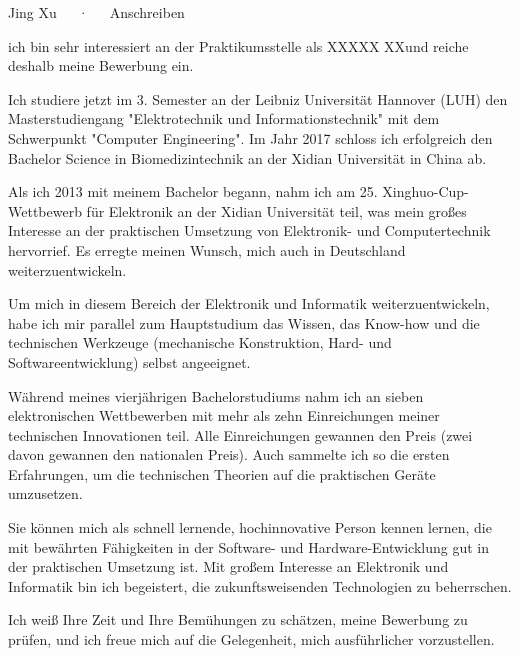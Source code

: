 \documentclass[11pt, a4paper]{awesome-cv}
\providecommand{\applicatename}{XXXXX  XX}
\begin{document}
\makecvheader[R]

\makecvfooter
  {}
  {Jing Xu~~~·~~~Anschreiben}
  {}

\makelettertitle

\begin{cvletter}


ich bin sehr interessiert an der Praktikumsstelle als \applicatename \space und reiche deshalb meine Bewerbung ein.

Ich studiere jetzt im 3. Semester an der Leibniz Universität Hannover (LUH) den Masterstudiengang "Elektrotechnik und Informationstechnik" mit dem Schwerpunkt "Computer Engineering". Im Jahr 2017 schloss ich erfolgreich den Bachelor Science in Biomedizintechnik an der Xidian Universität in China ab.

Als ich 2013 mit meinem Bachelor begann, nahm ich am 25. Xinghuo-Cup-Wettbewerb für Elektronik an der Xidian Universität teil, was mein großes Interesse an der praktischen Umsetzung von Elektronik- und Computertechnik hervorrief. Es erregte meinen Wunsch, mich auch in Deutschland weiterzuentwickeln.

Um mich in diesem Bereich der Elektronik und Informatik weiterzuentwickeln, habe ich mir parallel zum Hauptstudium das Wissen, das Know-how und die technischen Werkzeuge (mechanische Konstruktion, Hard- und Softwareentwicklung) selbst angeeignet.

Während meines vierjährigen Bachelorstudiums nahm ich an sieben elektronischen Wettbewerben mit mehr als zehn Einreichungen meiner technischen Innovationen teil. Alle Einreichungen gewannen den Preis (zwei davon gewannen den nationalen Preis). Auch sammelte ich so die ersten Erfahrungen, um die technischen Theorien auf die praktischen Geräte umzusetzen.

Sie können mich als schnell lernende, hochinnovative Person kennen lernen, die mit bewährten Fähigkeiten in der Software- und Hardware-Entwicklung gut in der praktischen Umsetzung ist. Mit großem Interesse an Elektronik und Informatik bin ich begeistert, die zukunftsweisenden Technologien zu beherrschen.

Ich weiß Ihre Zeit und Ihre Bemühungen zu schätzen, meine Bewerbung zu prüfen, und ich freue mich auf die Gelegenheit, mich ausführlicher vorzustellen.\\\\



\end{cvletter}


\makeletterclosing
\end{document}
